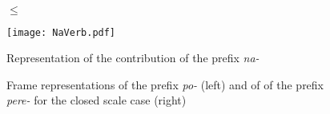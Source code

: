 \begin{figure}[H]
\begin{minipage}{0.4\textwidth}
\\
\vspace{1cm}
\centering
{} $\leq$ 
\end{minipage}
\hfill
\begin{minipage}{0.4\textwidth}
\texttt{[image: NaVerb.pdf]}\\
\end{minipage}
\caption{Representation of the contribution of the prefix \textit{na-}\label{app:na}}
\end{figure}

\begin{figure}[H]
\hfill%
\caption{Frame representations of the prefix \textit{po-} (left) and of of the prefix \textit{pere-} for the closed scale case (right) \label{app:po:delim}}
\end{figure}

